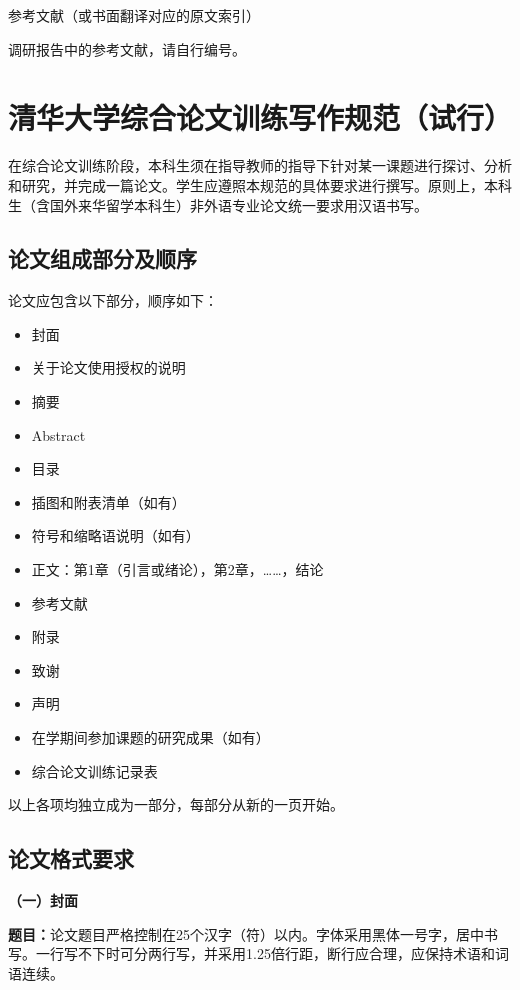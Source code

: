 \documentclass{Diploma}
\begin{document}
\begin{center}
参考文献（或书面翻译对应的原文索引）
\end{center}
\begin{reflist}
  \item 调研报告中的参考文献，请自行编号。
\end{reflist}

\chapter[require]{清华大学综合论文训练写作规范（试行）}
在综合论文训练阶段，本科生须在指导教师的指导下针对某一课题进行探讨、分析和研究，并完成一篇论文。学生应遵照本规范的具体要求进行撰写。原则上，本科生（含国外来华留学本科生）非外语专业论文统一要求用汉语书写。

\section{论文组成部分及顺序}
论文应包含以下部分，顺序如下：
\begin{itemize}
  \item 封面
  \item 关于论文使用授权的说明
  \item 摘要
  \item Abstract
  \item 目录
  \item 插图和附表清单（如有）
  \item 符号和缩略语说明（如有）
  \item 正文：第1章（引言或绪论），第2章，……，结论
  \item 参考文献
  \item 附录
  \item 致谢
  \item 声明
  \item 在学期间参加课题的研究成果（如有）
  \item 综合论文训练记录表
\end{itemize}
以上各项均独立成为一部分，每部分从新的一页开始。

\section{论文格式要求}

\noindent\textbf{（一）封面}

\textbf{题目：}论文题目严格控制在25个汉字（符）以内。字体采用黑体一号字，居中书写。一行写不下时可分两行写，并采用1.25倍行距，断行应合理，应保持术语和词语连续。
\end{document}
